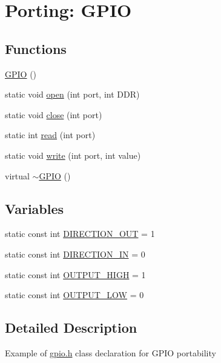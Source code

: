 \hypertarget{group__Porting__GPIO}{}\section{Porting\+: G\+P\+IO}
\label{group__Porting__GPIO}
\subsection*{Functions}
\begin{DoxyCompactItemize}
\item 
\hyperlink{group__Porting__GPIO_ga872483872ed4d11f46192619106a188c}{G\+P\+IO} ()
\item 
static void \hyperlink{group__Porting__GPIO_gad3451cca241dbbf42bf381129385a35c}{open} (int port, int D\+DR)
\item 
static void \hyperlink{group__Porting__GPIO_ga1b8cf31be61995207728f653ec11421f}{close} (int port)
\item 
static int \hyperlink{group__Porting__GPIO_ga783c8d81b91f178759766e7e62ea4b17}{read} (int port)
\item 
static void \hyperlink{group__Porting__GPIO_ga957694ca061e30268dd8a4b28a08e59b}{write} (int port, int value)
\item 
virtual \hyperlink{group__Porting__GPIO_gaef320e8e437ed827b571a212fc242a28}{$\sim$\+G\+P\+IO} ()
\end{DoxyCompactItemize}
\subsection*{Variables}
\begin{DoxyCompactItemize}
\item 
static const int \hyperlink{group__Porting__GPIO_gac39c2a3ce71b0df667c227292d4ab30c}{D\+I\+R\+E\+C\+T\+I\+O\+N\+\_\+\+O\+UT} = 1
\item 
static const int \hyperlink{group__Porting__GPIO_gafbf58b193d0f84db90a843e00f27367c}{D\+I\+R\+E\+C\+T\+I\+O\+N\+\_\+\+IN} = 0
\item 
static const int \hyperlink{group__Porting__GPIO_ga18fd76f29528fc97aadcdb78495ff6bf}{O\+U\+T\+P\+U\+T\+\_\+\+H\+I\+GH} = 1
\item 
static const int \hyperlink{group__Porting__GPIO_gaa29a50f0f8fc0a62076c7f4bc7dc70db}{O\+U\+T\+P\+U\+T\+\_\+\+L\+OW} = 0
\end{DoxyCompactItemize}


\subsection{Detailed Description}
Example of \hyperlink{gpio_8h}{gpio.\+h} class declaration for G\+P\+IO portability 

